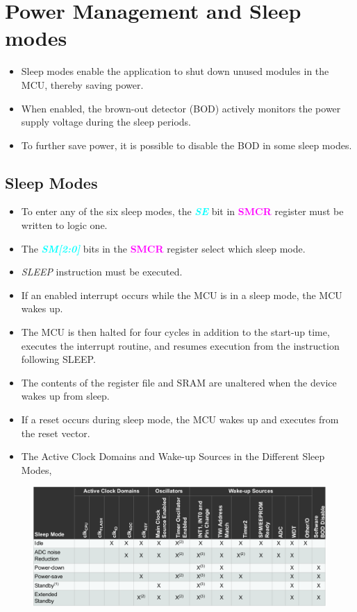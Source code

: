 \documentclass{article}
\newcommand{\bitFormat}[1]{\emph{\textbf{\textcolor{cyan}{#1}}}}
\newcommand{\regFormat}[1]{\textbf{\textcolor{magenta}{#1}}}
\begin{document}
\section{Power Management and Sleep modes}
\begin{itemize}
    \item Sleep modes enable the application to shut down unused modules in the MCU, thereby saving power.
    \item When enabled, the brown-out detector (BOD) actively monitors the power supply voltage during the sleep periods.
    \item To further save power, it is possible to disable the BOD in some sleep modes.
\end{itemize}

\subsection{Sleep Modes}
\begin{itemize}
    \item To enter any of the six sleep modes, the \bitFormat{SE} bit in \regFormat{SMCR} register must be written to logic one.
    \item The \bitFormat{SM[2:0]} bits in the \regFormat{SMCR} register select which sleep mode.
    \item \emph{SLEEP} instruction must be executed.
    \item If an enabled interrupt occurs while the MCU is in a sleep mode, the MCU wakes up.
    \item The MCU is then halted for four cycles in addition to the start-up time, executes the interrupt routine, and resumes execution from the instruction following SLEEP.
    \item The contents of the register file and SRAM are unaltered when the device wakes up from sleep. 
    \item If a reset occurs during sleep mode, the MCU wakes up and executes from the reset vector.
    \item The Active Clock Domains and Wake-up Sources in the Different Sleep Modes,
\end{itemize}
\begin{figure}[H]
    \begin{center}
        \includegraphics[width=1\textwidth]{sleepModeDomain.png}
    \end{center}
\end{figure}
\end{document}
